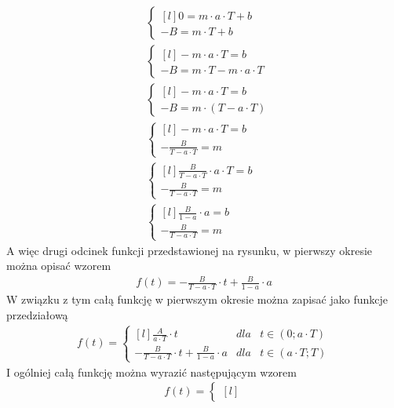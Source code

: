 \begin{task}
\begin{align*}
&\left\{\begin{matrix*}[l]
0 = m\cdot a \cdot T +b\\ 
-B = m\cdot T +b
\end{matrix*}\right. \\
&\left\{\begin{matrix*}[l]
-m \cdot a \cdot T = b\\ 
-B = m \cdot T -m \cdot a \cdot T
\end{matrix*}\right. \\
&\left\{\begin{matrix*}[l]
-m \cdot a \cdot T = b\\ 
-B = m \cdot \left( T - a \cdot T\right)
\end{matrix*}\right. \\
&\left\{\begin{matrix*}[l]
-m \cdot a \cdot T = b\\ 
-\frac{B}{T - a \cdot T} = m
\end{matrix*}\right. \\
&\left\{\begin{matrix*}[l]
\frac{B}{T - a \cdot T} \cdot a \cdot T = b\\ 
-\frac{B}{T - a \cdot T} = m
\end{matrix*}\right. \\
&\left\{\begin{matrix*}[l]
\frac{B}{1 - a} \cdot a = b\\ 
-\frac{B}{T - a \cdot T} = m
\end{matrix*}\right.
\end{align*}
A więc drugi odcinek funkcji przedstawionej na rysunku, w pierwszy okresie można opisać wzorem
\begin{align*}
f(t) = -\frac{B}{T - a \cdot T}\cdot t + \frac{B}{1 - a} \cdot a
\end{align*}
W związku z tym całą funkcję w pierwszym okresie można zapisać jako funkcje przedziałową
\begin{align*}
f(t) = \left\{\begin{matrix*}[l]
\frac{A}{a \cdot T}\cdot t & dla &t \in (0; a \cdot T)\\ 
-\frac{B}{T - a \cdot T}\cdot t + \frac{B}{1 - a} \cdot a & dla & t \in (a \cdot T; T)
\end{matrix*}\right.
\end{align*}
I ogólniej całą funkcję można wyrazić następującym wzorem
\begin{align*}
f(t) = \left\{\begin{matrix*}[l]

\end{matrix*}
\end{align*}
\end{task}
